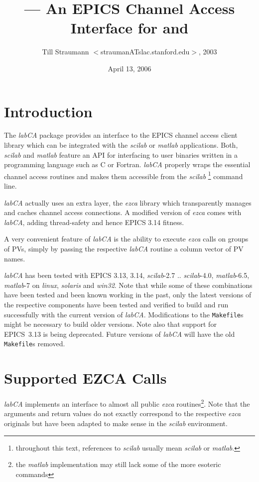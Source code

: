 \documentclass{article}
\title{\sca{} --- An EPICS Channel Access Interface for \scilab{} and \matlab{}}
\author{Till Straumann $<$straumanATslac.stanford.edu$>$, 2003}
\date{April 13, 2006}
\newcommand{\sca}{\ita{labCA}}
\newcommand{\scilab}{\ita{scilab}}
\newcommand{\matlab}{\ita{matlab}}
\newcommand{\windoze}{\ita{win32}}
\newcommand{\ezca}{\ita{ezca}}
\newcommand{\com}[1]{{\tt #1}}
\newcommand{\ita}[1]{\emph{#1}}
\begin{document}
\maketitle
{\hspace*{\fill}{\small\verb$Id: manual.tex,v 1.28 2006/04/13 22:22:49 till Exp $}\hspace*{\fill}}
\section{Introduction}
The \sca{} package provides an interface to the
EPICS channel access client library which can be
integrated with the \scilab{} or \matlab{} applications.
Both, \scilab{} and \matlab{} feature an API for interfacing
to user binaries written in a programming language such
as C or Fortran. \sca{} properly wraps the essential
channel access routines and makes them accessible
from the \scilab%
\footnote{throughout this text, references to \scilab{}
usually mean \scilab{} or \matlab.}
command line.

\sca{} actually uses an extra layer, the \ezca{} library
which transparently manages and caches channel access 
connections. A modified version of \ezca{} comes with
\sca, adding thread-safety and hence EPICS 3.14 fitness.

A very convenient feature of \sca{} is the ability
to execute \ezca{} calls on groups of PVs, simply by
passing the respective \sca{} routine a column vector
of PV names.

\sca{} has been tested with EPICS 3.13, 3.14, \scilab-2.7 .. \scilab-4.0,
\matlab-6.5, \matlab-7 on \ita{linux}, \ita{solaris} and
\windoze. Note that while some of these combinations have been
tested and been known working in the past, only the latest
versions of the respective components have been tested
and verified to build and run successfully with the
current version of \sca{}. Modifications to the \com{Makefile}s
might be necessary to build older versions. Note also
that support for EPICS~3.13 is being deprecated. Future
versions of \sca{} will have the old \com{Makefile}s removed.

\section{Supported EZCA Calls}
\sca{} implements an interface to almost all public
\ezca{} routines\footnote{%
the \matlab{} implementation may still lack some of the
more esoteric commands}. Note that the arguments and
return values do not exactly correspond to the respective
\ezca{} originals but have been adapted to make sense
in the  \scilab{} environment.
\end{document}
